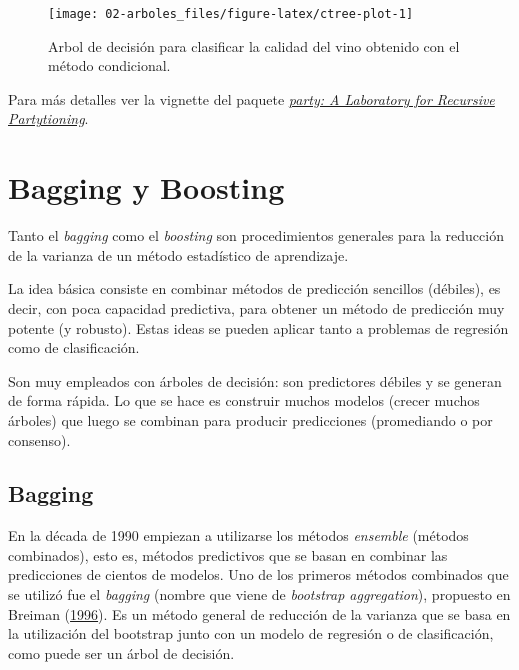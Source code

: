 \documentclass[
  spanish,
]{book}
\theoremstyle{break}
\theoremstyle{definition}
\theoremstyle{definition}
\theoremstyle{definition}
\theoremstyle{remark}
\begin{document}
\begin{figure}[!htb]

{\centering \texttt{[image: 02-arboles\_files/figure-latex/ctree-plot-1]} 

}

\caption{Arbol de decisión para clasificar la calidad del vino obtenido con el método condicional.}\label{fig:ctree-plot}
\end{figure}

Para más detalles ver la vignette del paquete \href{https://cran.r-project.org/web/packages/party/vignettes/party.pdf}{\emph{party: A Laboratory for Recursive Partytioning}}.

\hypertarget{bagging-boosting}{%
\chapter{Bagging y Boosting}\label{bagging-boosting}}

Tanto el \emph{bagging} como el \emph{boosting} son procedimientos generales para la reducción de la varianza de un método estadístico de aprendizaje.

La idea básica consiste en combinar métodos de predicción sencillos (débiles), es decir, con poca capacidad predictiva, para obtener un método de predicción muy potente (y robusto).
Estas ideas se pueden aplicar tanto a problemas de regresión como de clasificación.

Son muy empleados con árboles de decisión: son predictores débiles y se generan de forma rápida.
Lo que se hace es construir muchos modelos (crecer muchos árboles) que luego se combinan para producir predicciones (promediando o por consenso).

\hypertarget{bagging}{%
\section{Bagging}\label{bagging}}

En la década de 1990 empiezan a utilizarse los métodos \emph{ensemble} (métodos combinados), esto es, métodos predictivos que se basan en combinar las predicciones de cientos de modelos.
Uno de los primeros métodos combinados que se utilizó fue el \emph{bagging} (nombre que viene de \emph{bootstrap aggregation}), propuesto en Breiman (\protect\hyperlink{ref-breiman1996bagging}{1996}).
Es un método general de reducción de la varianza que se basa en la utilización del bootstrap junto con un modelo de regresión o de clasificación, como puede ser un árbol de decisión.
\end{document}
